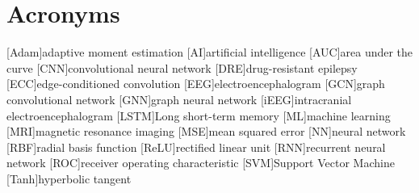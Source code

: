
\chapter{Acronyms} \label{chap: Acronyms}

\begin{acronym}[AAAAA]
    [Adam]{adaptive moment estimation}
    [AI]{artificial intelligence}
    [AUC]{area under the curve}
    [CNN]{convolutional neural network}
    [DRE]{drug-resistant epilepsy}
    [ECC]{edge-conditioned convolution}
    [EEG]{electroencephalogram}
    [GCN]{graph convolutional network}
    [GNN]{graph neural network}
    [iEEG]{intracranial electroencephalogram}
    [LSTM]{Long short-term memory}
    [ML]{machine learning}
    [MRI]{magnetic resonance imaging}
    [MSE]{mean squared error}
    [NN]{neural network}
    [RBF]{radial basis function}
    [ReLU]{rectified linear unit}
    [RNN]{recurrent neural network}
    [ROC]{receiver operating characteristic}
    [SVM]{Support Vector Machine}
    [Tanh]{hyperbolic tangent}
\end{acronym}
